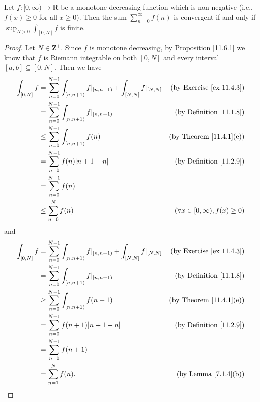 \begin{proposition}\label{11.6.4}
    Let \(f : [0, \infty) \to \mathbf{R}\) be a monotone decreasing function which is non-negative
    (i.e., \(f(x) \geq 0\) for all \(x \geq 0\)).
    Then the sum \(\sum_{n = 0}^\infty f(n)\) is convergent if and only if \(\sup_{N > 0} \int_{[0, N]} f\) is finite.
\end{proposition}

\begin{proof}
    Let \(N \in \mathbf{Z}^+\).
    Since \(f\) is monotone decreasing, by Proposition \ref{11.6.1} we know that \(f\) is Riemann integrable on both \([0, N]\) and every interval \([a, b] \subseteq [0, N]\).
    Then we have
    \begin{align*}
        \int_{[0, N]} f & = \sum_{n = 0}^{N - 1} \int_{[n, n + 1)} f|_{[n, n + 1)} + \int_{[N, N]} f|_{[N, N]} & \text{(by Exercise \ref{ex 11.4.3})}     \\
                        & = \sum_{n = 0}^{N - 1} \int_{[n, n + 1)} f|_{[n, n + 1)}                             & \text{(by Definition \ref{11.1.8})}      \\
                        & \leq \sum_{n = 0}^{N - 1} \int_{[n, n + 1)} f(n)                                     & \text{(by Theorem \ref{11.4.1}(e))}      \\
                        & = \sum_{n = 0}^{N - 1} f(n) \abs*{n + 1 - n}                                         & \text{(by Definition \ref{11.2.9})}      \\
                        & = \sum_{n = 0}^{N - 1} f(n)                                                                                                     \\
                        & \leq \sum_{n = 0}^N f(n)                                                             & (\forall x \in [0, \infty), f(x) \geq 0)
    \end{align*}
    and
    \begin{align*}
        \int_{[0, N]} f & = \sum_{n = 0}^{N - 1} \int_{[n, n + 1)} f|_{[n, n + 1)} + \int_{[N, N]} f|_{[N, N]} & \text{(by Exercise \ref{ex 11.4.3})} \\
                        & = \sum_{n = 0}^{N - 1} \int_{[n, n + 1)} f|_{[n, n + 1)}                             & \text{(by Definition \ref{11.1.8})}  \\
                        & \geq \sum_{n = 0}^{N - 1} \int_{[n, n + 1)} f(n + 1)                                 & \text{(by Theorem \ref{11.4.1}(e))}  \\
                        & = \sum_{n = 0}^{N - 1} f(n + 1) \abs*{n + 1 - n}                                     & \text{(by Definition \ref{11.2.9})}  \\
                        & = \sum_{n = 0}^{N - 1} f(n + 1)                                                                                             \\
                        & = \sum_{n = 1}^N f(n).                                                               & \text{(by Lemma \ref{7.1.4}(b))}
    \end{align*}


\end{proof}
